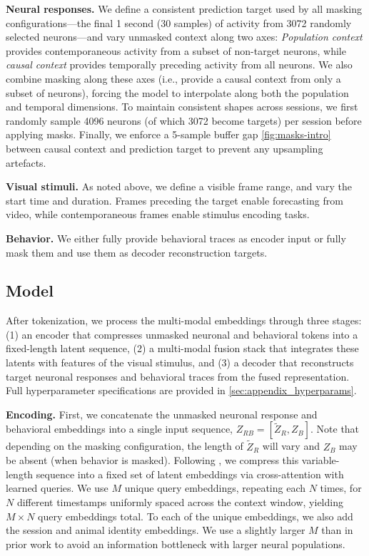 \documentclass{article} %
\begin{document}
\textbf{Neural responses.} We define a consistent prediction target used by all masking configurations---the final 1 second (30 samples) of activity from 3072 randomly selected neurons---and vary unmasked context along two axes: \textit{Population context} provides contemporaneous activity from a subset of non-target neurons, while \textit{causal context} provides temporally preceding activity from all neurons. We also combine masking along these axes (i.e., provide a causal context from only a subset of neurons), forcing the model to interpolate along both the population and temporal dimensions. To maintain consistent shapes across sessions, we first randomly sample 4096 neurons (of which 3072 become targets) per session before applying masks. Finally, we enforce a 5-sample buffer gap  \cref{fig:masks-intro} between causal context and prediction target to prevent any upsampling artefacts.

\textbf{Visual stimuli.} As noted above, we define a visible frame range, and vary the start time and duration. Frames preceding the target enable forecasting from video, while contemporaneous frames enable stimulus encoding tasks.

\textbf{Behavior.} We either fully provide behavioral traces as encoder input or fully mask them and use them as decoder reconstruction targets.

\subsection{Model}
After tokenization, we process the multi-modal embeddings through three stages: (1) an encoder that compresses unmasked neuronal and behavioral tokens into a fixed-length latent sequence, (2) a multi-modal fusion stack that integrates these latents with features of the visual stimulus, and (3) a decoder that reconstructs target neuronal responses and behavioral traces from the fused representation. Full hyperparameter specifications are provided in \cref{sec:appendix_hyperparams}.

\textbf{Encoding.} First, we concatenate the unmasked neuronal response and behavioral embeddings into a single input sequence, $Z_{RB} = \left[\widetilde{Z}_R, Z_B\right]$. Note that depending on the masking configuration, the length of $\tilde{Z}_R$ will vary and $Z_B$ may be absent (when behavior is masked). Following \citet{azabou2023unified, poyov2iclr2025}, we compress this variable-length sequence into a fixed set of latent embeddings via cross-attention with learned queries. We use $M$ unique query embeddings, repeating each $N$ times, for $N$ different timestamps uniformly spaced across the context window, yielding $M \times N$ query embeddings total. To each of the unique embeddings, we also add the session and animal identity embeddings. We use a slightly larger $M$ than in prior work to avoid an information bottleneck with larger neural populations.
\end{document}
